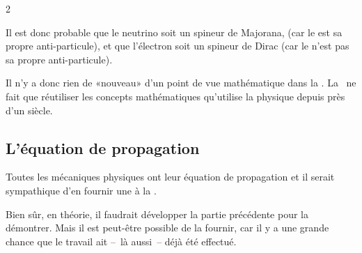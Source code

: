 \begin{multicols}{2}
\clearpage
\begin{center}
\end{center}

Il est donc probable que le neutrino soit un spineur de Majorana, (car le  est sa propre anti-particule), et que l'électron soit un spineur de Dirac (car le  n'est pas sa propre anti-particule).

Il n'y a donc rien de «nouveau» d'un point de vue mathématique dans
la \PQ. La \PQ\ ne fait que réutiliser les concepts mathématiques
qu'utilise la physique depuis près d'un siècle. \cite{hestenes1966space, lounesto2001clifford}

\subsection{L'équation de propagation}

Toutes les mécaniques physiques ont leur équation de propagation et il
serait sympathique d'en fournir une à la \PQ.

Bien sûr, en théorie, il faudrait développer la partie précédente pour
la démontrer. Mais il est peut-être possible de la fournir, car il y a une
grande chance que le travail ait --~là aussi~-- déjà été effectué.


\end{multicols}
